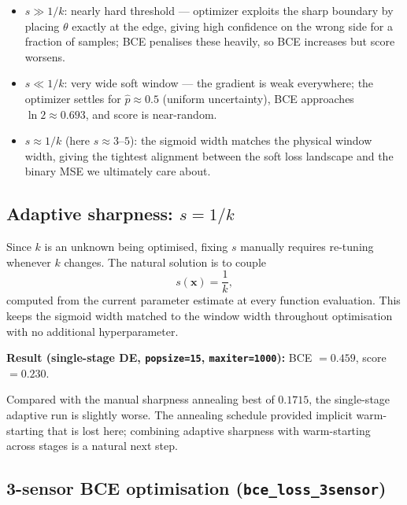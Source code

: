 \documentclass[11pt,a4paper]{article}
\begin{document}
\begin{itemize}
  \item $s \gg 1/k$: nearly hard threshold --- optimizer exploits the sharp
        boundary by placing $\theta$ exactly at the edge, giving high
        confidence on the wrong side for a fraction of samples; BCE penalises
        these heavily, so BCE increases but score worsens.
  \item $s \ll 1/k$: very wide soft window --- the gradient is weak
        everywhere; the optimizer settles for $\hat{p}\approx 0.5$
        (uniform uncertainty), BCE approaches $\ln 2\approx 0.693$, and
        score is near-random.
  \item $s \approx 1/k$ (here $s\approx 3$--$5$): the sigmoid width matches
        the physical window width, giving the tightest alignment between the
        soft loss landscape and the binary MSE we ultimately care about.
\end{itemize}

\subsection{Adaptive sharpness: $s = 1/k$}

Since $k$ is an unknown being optimised, fixing $s$ manually requires
re-tuning whenever $k$ changes.  The natural solution is to couple
\[
  s(\mathbf{x}) = \frac{1}{k},
\]
computed from the current parameter estimate at every function evaluation.
This keeps the sigmoid width matched to the window width throughout
optimisation with no additional hyperparameter.

\textbf{Result (single-stage DE, \texttt{popsize=15}, \texttt{maxiter=1000}):}
BCE $= 0.459$, score $= 0.230$.

Compared with the manual sharpness annealing best of $0.1715$, the single-stage
adaptive run is slightly worse.  The annealing schedule provided implicit
warm-starting that is lost here; combining adaptive sharpness with
warm-starting across stages is a natural next step.

\subsection{3-sensor BCE optimisation (\texttt{bce\_loss\_3sensor})}
\end{document}
